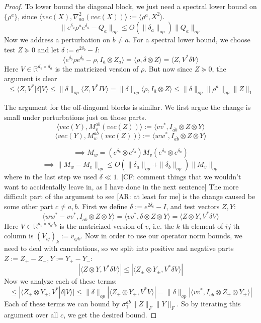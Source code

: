 \documentclass{article}
\newcommand{\R}{{\mathbb{R}}}
\newcommand{\CF}[1]{{\color{purple}[CF: #1]}}
\newcommand{\AR}[1]{{\color{orange}[AR: #1]}}
\begin{document}
\begin{proof}
To lower bound the diagonal block, we just need a spectral lower bound on $\{\rho^{a}\}$, since $\langle vec(X), \nabla_{aa}^{2} (vec(X)) \rangle := \langle \rho^{a}, X^{2} \rangle$.
\[ \| e^{\delta_{a}} \rho^{a} e^{\delta_{a}} - Q_{a}\|_{op} \leq O(\|\delta_{a}\|_{op}) \|Q_{a}\|_{op}   \]
Now we address a perturbation on $b \neq a$. For a spectral lower bound, we choose test $Z \succeq 0$ and let $\delta := e^{2\delta_{b}} - I$:
\[ \langle e^{\delta_{b}} \rho e^{\delta_{b}} - \rho, I_{\overline{a}} \otimes Z_{a} \rangle
= \langle \rho, \delta \otimes Z \rangle = \langle Z, V^{*} \delta V \rangle   \]
Here $V \in \R^{d_{b} \times d_{a}}$ is the matricized version of $\rho$. But now since $Z \succeq 0$, the argument is clear
\[ \leq \langle Z, V^{*} |\delta| V \rangle \leq \|\delta\|_{op} \langle Z, V^{*} I V \rangle = \|\delta\|_{op} \langle \rho, I_{\overline{a}} \otimes Z \rangle \leq \|\delta\|_{op} \|\rho^{a}\|_{op} \|Z\|_{1}    \]

The argument for the off-diagonal blocks is similar. We first argue the change is small under perturbations just on those parts. 
\[ \langle vec(Y), M_{v}^{ab}(vec(Z)) \rangle := \langle v v^{*}, I_{\overline{ab}} \otimes Z \otimes Y \rangle \]
\[ \langle vec(Y), M_{w}^{ab}(vec(Z)) \rangle := \langle w w^{*}, I_{\overline{ab}} \otimes Z \otimes Y \rangle\]

\[ \implies M_{w} = (e^{\delta_{b}} \otimes e^{\delta_{b}}) M_{v} (e^{\delta_{a}} \otimes e^{\delta_{a}})   \]
\[ \implies \|M_{w} - M_{v}\|_{op} \leq O(\|\delta_{a}\|_{op} + \|\delta_{b}\|_{op}) \|M_{v}\|_{op}   \]
where in the last step we used $\delta \ll 1$.
\CF{comment things that we wouldn't want to accidentally leave in, as I have done in the next sentence}
The more difficult part of the argument to see \AR{at least for me} is the change caused be some other part $c \neq a,b$. First we define $\delta := e^{2 \delta_{c}} - I$, and test vectors $Z,Y$:
\[ \langle w w^{*} - v v^{*}, I_{\overline{ab}} \otimes Z \otimes Y \rangle = \langle v v^{*}, \delta \otimes Z \otimes Y \rangle  = \langle Z \otimes Y, V^{*} \delta V \rangle \]
Here $V \in \R^{d_{c} \times d_{a}d_{b}}$ is the matricized version of $v$, i.e. the $k$-th element of $ij$-th column is $(V_{ij})_{k} := v_{ijk}$. Now in order to use our operator norm bounds, we need to deal with cancelations, so we split into positive and negative parts $Z := Z_{+} - Z_{-}, Y := Y_{+} - Y_{-}$:
\[ |\langle Z \otimes Y, V^{*} \delta V \rangle| \leq |\langle Z_{\pm} \otimes Y_{\pm}, V^{*} \delta V \rangle |  \]
Now we analyze each of these terms:
\[ \leq |\langle Z_{\pm} \otimes Y_{\pm}, V^{*} |\delta| V \rangle| \leq \|\delta\|_{op} |\langle Z_{\pm} \otimes Y_{\pm}, V^{*} V \rangle| = \|\delta\|_{op} |\langle v v^{*}, I_{\overline{ab}} \otimes Z_{\pm} \otimes Y_{\pm} \rangle|   \]
Each of these terms we can bound by $\sigma^{ab}_{1} \|Z\|_{F} \|Y\|_{F}$. So by iterating this argument over all $c$, we get the desired bound.
\end{proof}
\end{document}
